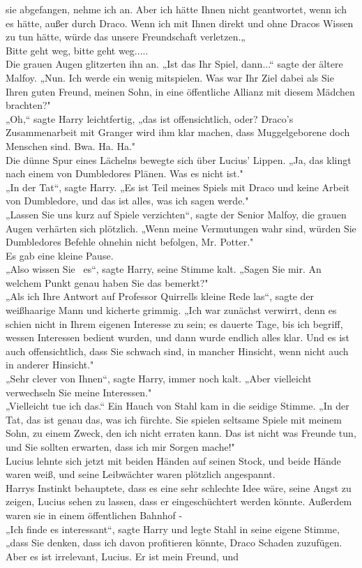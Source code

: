 {sie abgefangen, nehme ich an. Aber ich hätte Ihnen nicht geantwortet, wenn ich es hätte, außer durch Draco. Wenn ich mit Ihnen direkt und ohne Dracos Wissen zu tun hätte, würde das unsere Freundschaft verletzen.„\\ Bitte geht weg, bitte geht weg.....\\ Die grauen Augen glitzerten ihn an. „Ist das Ihr Spiel, dann...“ sagte der ältere Malfoy. „Nun. Ich werde ein wenig mitspielen. Was war Ihr Ziel dabei als Sie Ihren guten Freund, meinen Sohn, in eine öffentliche Allianz mit diesem Mädchen brachten?"\\ „Oh,“ sagte Harry leichtfertig, „das ist offensichtlich, oder? Draco's Zusammenarbeit mit Granger wird ihm klar machen, dass Muggelgeborene doch Menschen sind. Bwa. Ha. Ha."\\ Die dünne Spur eines Lächelns bewegte sich über Lucius' Lippen. „Ja, das klingt nach einem von Dumbledores Plänen. Was es nicht ist."\\ „In der Tat“, sagte Harry. „Es ist Teil meines Spiels mit Draco und keine Arbeit von Dumbledore, und das ist alles, was ich sagen werde."\\ „Lassen Sie uns kurz auf Spiele verzichten“, sagte der Senior Malfoy, die grauen Augen verhärten sich plötzlich. „Wenn meine Vermutungen wahr sind, würden Sie Dumbledores Befehle ohnehin nicht befolgen, Mr. Potter."\\ Es gab eine kleine Pause.\\ „Also wissen Sie ~es“, sagte Harry, seine Stimme kalt. „Sagen Sie mir. An welchem Punkt genau haben Sie das bemerkt?"\\ „Als ich Ihre Antwort auf Professor Quirrells kleine Rede las“, sagte der weißhaarige Mann und kicherte grimmig. „Ich war zunächst verwirrt, denn es schien nicht in Ihrem eigenen Interesse zu sein; es dauerte Tage, bis ich begriff, wessen Interessen bedient wurden, und dann wurde endlich alles klar. Und es ist auch offensichtlich, dass Sie schwach sind, in mancher Hinsicht, wenn nicht auch in anderer Hinsicht."\\ „Sehr clever von Ihnen“, sagte Harry, immer noch kalt. „Aber vielleicht verwechseln Sie meine Interessen."\\ „Vielleicht tue ich das.“ Ein Hauch von Stahl kam in die seidige Stimme. „In der Tat, das ist genau das, was ich fürchte. Sie spielen seltsame Spiele mit meinem Sohn, zu einem Zweck, den ich nicht erraten kann. Das ist nicht was Freunde tun, und Sie sollten erwarten, dass ich mir Sorgen mache!"\\ Lucius lehnte sich jetzt mit beiden Händen auf seinen Stock, und beide Hände waren weiß, und seine Leibwächter waren plötzlich angespannt.\\ Harrys Instinkt behauptete, dass es eine sehr schlechte Idee wäre, seine Angst zu zeigen, Lucius sehen zu lassen, dass er eingeschüchtert werden könnte. Außerdem waren sie in einem öffentlichen Bahnhof -\\ „Ich finde es interessant“, sagte Harry und legte Stahl in seine eigene Stimme, „dass Sie denken, dass ich davon profitieren könnte, Draco Schaden zuzufügen. Aber es ist irrelevant, Lucius. Er ist mein Freund, und }

